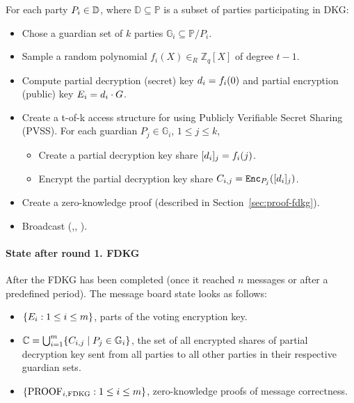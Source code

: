 \documentclass{article}
\begin{document}
For each party $P_{i} \in \mathbb{D}$, where $\mathbb{D} \subseteq  \mathbb{P}$ is a subset of parties participating in DKG:
\begin{itemize}
    \item Chose a guardian set of $k$ parties  $\mathbb{G}_i\subseteq \mathbb{P}/P_i$.
    \item Sample a random polynomial $f_{i}(X) \in_R \mathbb{Z}_q[X]$ of degree $t-1$.
    \item Compute partial decryption (secret) key $d_{i}= f_i(0)$ and partial encryption (public) key $E_{i} = d_{i} \cdot G$.
    \item Create a t-of-k access structure for  using Publicly Verifiable Secret Sharing (PVSS). For each guardian $P_{j} \in \mathbb{G}_i$, $1 \leq j \leq k$, \begin{itemize}
    \item Create a partial decryption key share $[d_{i}]_{j}=f_i(j)$.
    \item Encrypt the partial decryption key share $C_{i,j}=\texttt{Enc}_{P_{j}}([d_{i}]_{j})$.
    \end{itemize}
    
    \item Create a zero-knowledge proof (described in Section~\ref{sec:proof-fdkg}).
    \item Broadcast (,, ).
\end{itemize}

\paragraph*{State after round 1. FDKG}

After the FDKG has been completed (once it reached $n$ messages or after a predefined period). The message board state looks as follows:
\begin{itemize}
    \item $\{E_{i} : 1 \leq i \leq m\}$, parts of the voting encryption key.
    \item $\mathbb{C} = \bigcup_{i=1}^{m} \{C_{i,j} \mid P_j \in \mathbb{G}_i\}$, the set of all encrypted shares of partial decryption key sent from all parties to all other parties in their respective guardian sets.
    \item $\{\textrm{PROOF}_{i,\textrm{FDKG}} : 1 \leq i \leq m\}$, zero-knowledge proofs of message correctness.
\end{itemize}
\end{document}
